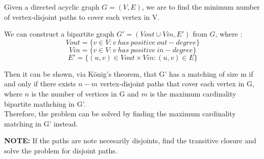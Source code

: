 Given a directed acyclic graph $G = (V, E)$, we are to find the minimum number
of vertex-disjoint paths to cover each vertex in V.

We can construct a bipartite graph $G' = (Vout \cup Vin, E' )$ from $G$, where : \\

$$ Vout = \{ v \in V : v~has~positive~out-degree \} $$
$$ Vin = \{ v \in V : v~has~positive~in-degree \} $$
$$ E' = \{ (u,v) \in Vout \times Vin : (u,v) \in E \} $$

Then it can be shown, via König's theorem, that G' has a matching of size m if
and only if there exists $n-m$ vertex-disjoint paths that cover each vertex in G,
where $n$ is the number of vertices in G and $m$ is the maximum cardinality
bipartite mathching in G'. \\

Therefore, the problem can be solved by finding the maximum cardinality matching in G' instead.

\textbf{NOTE:} If the paths are note necesarily disjoints, find the transitive closure
and solve the problem for disjoint paths.